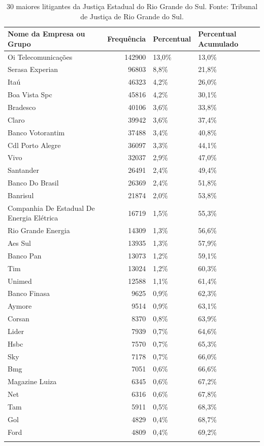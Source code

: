 \documentclass[]{report}
\begin{document}
\begin{longtable}{lrll}
\caption{30 maiores litigantes da Justiça Estadual do Rio Grande do Sul. Fonte: Tribunal de Justiça de Rio Grande do Sul.} \\
  \hline
Nome da Empresa ou Grupo & Frequência & Percentual & Percentual Acumulado \\
  \hline
Oi
Telecomunicações & 142900 & 13,0\% & 13,0\% \\
  Serasa Experian & 96803 & 8,8\% & 21,8\% \\
  Itaú & 46323 & 4,2\% & 26,0\% \\
  Boa Vista Spc & 45816 & 4,2\% & 30,1\% \\
  Bradesco & 40106 & 3,6\% & 33,8\% \\
  Claro & 39942 & 3,6\% & 37,4\% \\
  Banco
Votorantim & 37488 & 3,4\% & 40,8\% \\
  Cdl Porto
Alegre & 36097 & 3,3\% & 44,1\% \\
  Vivo & 32037 & 2,9\% & 47,0\% \\
  Santander & 26491 & 2,4\% & 49,4\% \\
  Banco Do Brasil & 26369 & 2,4\% & 51,8\% \\
  Banrisul & 21874 & 2,0\% & 53,8\% \\
  Companhia
De Estadual
De Energia
Elétrica & 16719 & 1,5\% & 55,3\% \\
  Rio Grande
Energia & 14309 & 1,3\% & 56,6\% \\
  Aes Sul & 13935 & 1,3\% & 57,9\% \\
  Banco Pan & 13073 & 1,2\% & 59,1\% \\
  Tim & 13024 & 1,2\% & 60,3\% \\
  Unimed & 12588 & 1,1\% & 61,4\% \\
  Banco Finasa & 9625 & 0,9\% & 62,3\% \\
  Aymore & 9514 & 0,9\% & 63,1\% \\
  Corsan & 8370 & 0,8\% & 63,9\% \\
  Lider & 7939 & 0,7\% & 64,6\% \\
  Hsbc & 7570 & 0,7\% & 65,3\% \\
  Sky & 7178 & 0,7\% & 66,0\% \\
  Bmg & 7051 & 0,6\% & 66,6\% \\
  Magazine Luiza & 6345 & 0,6\% & 67,2\% \\
  Net & 6316 & 0,6\% & 67,8\% \\
  Tam & 5911 & 0,5\% & 68,3\% \\
  Gol & 4829 & 0,4\% & 68,7\% \\
  Ford & 4809 & 0,4\% & 69,2\% \\
   \hline
\hline
\label{unnamed-chunk-5}
\end{longtable}
\end{document}
